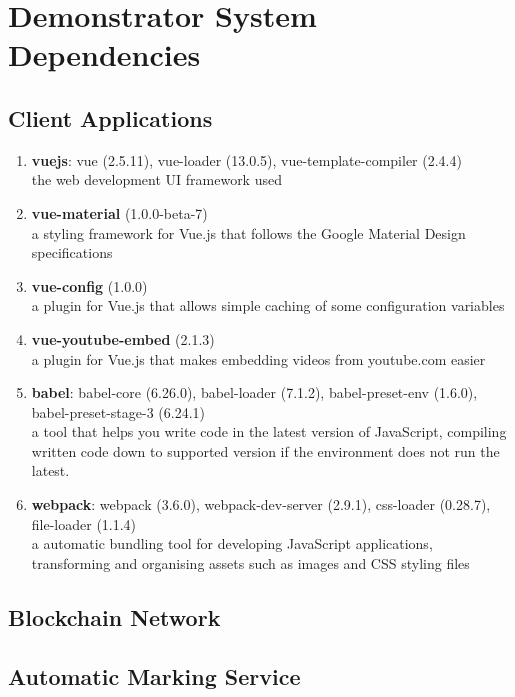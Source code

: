
\chapter{Demonstrator System Dependencies}

\section{Client Applications}

\begin{enumerate}
	\setlength\itemsep{0em}
	\item \textbf{vuejs}: vue (2.5.11), vue-loader (13.0.5), vue-template-compiler (2.4.4)\\
	      the web development UI framework used
	\item \textbf{vue-material} (1.0.0-beta-7)\\
	      a styling framework for Vue.js that follows the Google Material Design specifications
	\item \textbf{vue-config} (1.0.0)\\
	      a plugin for Vue.js that allows simple caching of some configuration variables
	\item \textbf{vue-youtube-embed} (2.1.3)\\
	      a plugin for Vue.js that makes embedding videos from youtube.com easier
	\item \textbf{babel}: babel-core (6.26.0), babel-loader (7.1.2), babel-preset-env (1.6.0), babel-preset-stage-3 (6.24.1)\\
	      a tool that helps you write code in the latest version of JavaScript, compiling written code down to supported version if the environment does not run the latest.
	\item \textbf{webpack}: webpack (3.6.0), webpack-dev-server (2.9.1), css-loader (0.28.7), file-loader (1.1.4)\\
	      a automatic bundling tool for developing JavaScript applications, transforming and organising assets such as images and CSS styling files
\end{enumerate}

\section{Blockchain Network}

\section{Automatic Marking Service}